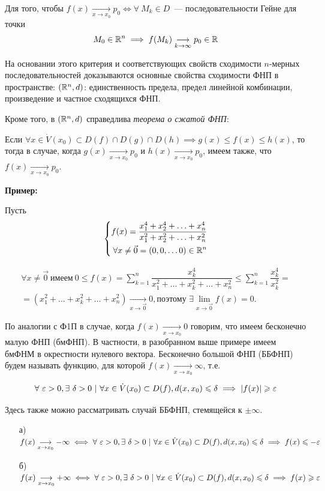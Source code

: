 \documentclass[../../main.tex]{subfiles}
\begin{document}
Для того, чтобы $f(x)\underset{x \to x_0}{\longrightarrow}p_0 \iff
\forall\ M_k \in D$~--- последовательности Гейне для точки 
\[M_0 \in \mathbb{R}^n \implies f(M_k)\underset{k \to \infty}
{\longrightarrow}p_0 \in \mathbb{R}\]   

На основании этого критерия и соответствующих свойств сходимости $n$-мерных
последовательностей доказываются основные свойства сходимости ФНП
в пространстве: $(\mathbb{R}^n, d)$: единственность предела, предел линейной
комбинации, произведение и частное сходящихся ФНП.

Кроме того, в $(\mathbb{R}^n, d)$ справедлива \emph{теорема о сжатой ФНП}:

Если $\forall x \in \dot{V}(x_0) \subset D(f) \cap D(g) \cap D(h) \implies
g(x) \leq f(x) \leq h(x)$, то тогда в случае, когда
$g(x)\underset{x \to x_0}{\longrightarrow}p_0
$ и $h(x)\underset{x \to x_0}{\longrightarrow}p_0$,
имеем также, что $f(x)\underset{x \to x_0}{\longrightarrow}p_0$.

\textbf{Пример:}

Пусть \[ \left\{\begin{aligned}
	f(x) = \dfrac{x_1^4 + x_2^4 + \ldots + x_n^4}{x_1^2 + x_2^2 +
		\ldots + x_n^2} \\
	\forall x \ne \vec{0} = (0, 0, \ldots 0) \in \mathbb{R}^n
\end{aligned}\right. \]

\begin{gather*}
	\forall x \ne \vec{0}\ \text{имеем}\ 0 \leq f(x) =
	\displaystyle\sum_{k=1}^{n}{\dfrac{x_k^4}{x_1^2 + \dots + x_k^2 +
			\ldots + x_n^2}} \le
	\displaystyle\sum_{k=1}^{n}{\dfrac{x_k^4}{x_k^2}} = \\ =
	(x_1^2 + \ldots + x_k^2 + \ldots + x_n^2)
	\underset{x \to \vec{0}}{\longrightarrow}0, \text{поэтому }
	\exists\displaystyle\lim_{x \to \vec{0}}f(x) = 0.
\end{gather*}

По аналогии с Ф1П в случае, когда $f(x)\underset{x \to x_0}{\longrightarrow}0$
говорим, что имеем бесконечно малую ФНП (бмФНП). В частности,
в разобранном выше примере имеем бмФНМ в окрестности нулевого вектора.
Бесконечно большой ФНП (ББФНП) будем называть функцию,
для которой $f(x)\underset{x \to x_0}{\longrightarrow}\infty$, т.е.

\[\forall\ \varepsilon > 0, \exists\ \delta > 0\ |\
\forall x \in \dot{V}(x_0) \subset D(f), d(x, x_0) \leqslant \delta
\implies |f(x)| \geqslant \varepsilon\]

Здесь также можно рассматривать случай ББФНП, стемящейся к $\pm \infty$.
\begin{itemize}
	\item[а)] $f(x)\underset{x \to x_0}{\longrightarrow} -\infty \iff
	\forall\ \varepsilon > 0, \exists\ \delta > 0\ |\
	\forall x \in \dot{V}(x_0) \subset D(f), d(x, x_0) \leqslant \delta
	\implies f(x) \leqslant -\varepsilon$
	\item[б)] $f(x)\underset{x \to x_0}{\longrightarrow} +\infty \iff
	\forall\ \varepsilon > 0, \exists\ \delta > 0\ |\
	\forall x \in \dot{V}(x_0) \subset D(f), d(x, x_0) \leqslant \delta
	\implies f(x) \geqslant \varepsilon$
\end{itemize}
\end{document}
